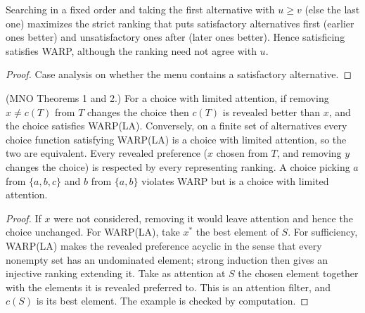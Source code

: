 \begin{theorem}
\label{thm:beh-satisfice}
\leanok
Searching in a fixed order and taking the first alternative with $u\ge v$ (else the last one) maximizes the strict
ranking that puts satisfactory alternatives first (earlier ones better) and unsatisfactory ones after (later ones
better). Hence satisficing satisfies WARP, although the ranking need not agree with $u$.
\end{theorem}
\begin{proof}
\leanok
Case analysis on whether the menu contains a satisfactory alternative.
\end{proof}

\begin{theorem}
\label{thm:beh-mno}
\leanok
(MNO Theorems 1 and 2.) For a choice with limited attention, if removing $x\ne c(T)$ from $T$ changes the choice then $c(T)$ is revealed better
than $x$, and the choice satisfies WARP(LA). Conversely, on a finite set of alternatives every choice function satisfying
WARP(LA) is a choice with limited attention, so the two are equivalent. Every revealed preference ($x$ chosen from $T$,
and removing $y$ changes the choice) is respected by every representing ranking. A choice picking $a$ from $\{a,b,c\}$
and $b$ from $\{a,b\}$ violates WARP but is a choice with limited attention.
\end{theorem}
\begin{proof}
\leanok
If $x$ were not considered, removing it would leave attention and hence the choice unchanged. For WARP(LA), take $x^*$
the best element of $S$. For sufficiency, WARP(LA) makes the revealed preference acyclic in the sense that every nonempty
set has an undominated element; strong induction then gives an injective ranking extending it. Take as attention
at $S$ the chosen element together with the elements it is revealed preferred to. This is an attention filter, and
$c(S)$ is its best element. The example is checked by computation.
\end{proof}

